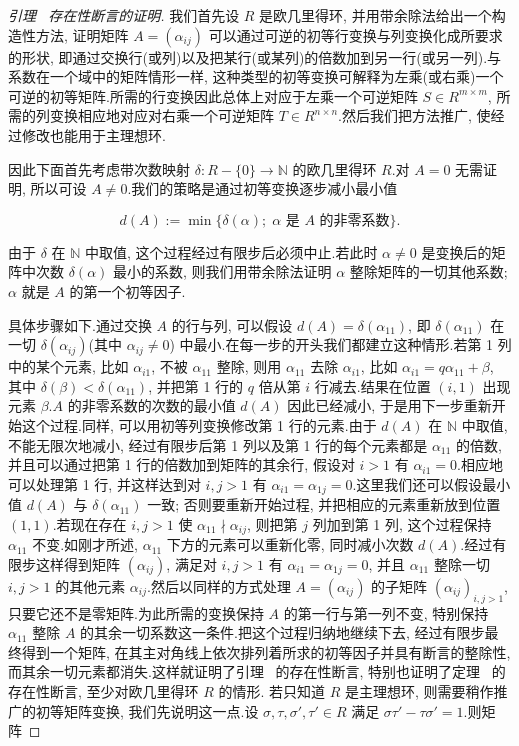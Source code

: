 \begin{proof}[引理~ 存在性断言的证明]
我们首先设 $R$ 是欧几里得环, 并用带余除法给出一个构造性方法, 证明矩阵 $A = (\alpha_{ij})$ 可以通过可逆的初等行变换与列变换化成所要求的形状, 即通过交换行(或列)以及把某行(或某列)的倍数加到另一行(或另一列).与系数在一个域中的矩阵情形一样, 这种类型的初等变换可解释为左乘(或右乘)一个可逆的初等矩阵.所需的行变换因此总体上对应于左乘一个可逆矩阵 $S \in R^{m \times m}$, 所需的列变换相应地对应对右乘一个可逆矩阵 $T \in R^{n \times n}$.然后我们把方法推广, 使经过修改也能用于主理想环.

因此下面首先考虑带次数映射 $\delta \colon R - \{0\} \longrightarrow \mathbb{N}$ 的欧几里得环 $R$.对 $A = 0$ 无需证明, 所以可设 $A \neq 0$.我们的策略是通过初等变换逐步减小最小值

\[
d(A) := \min\{\delta(\alpha);\; \alpha \text{ 是 } A \text{ 的非零系数}\}\text{.}\]

由于 $\delta$ 在 $\mathbb{N}$ 中取值, 这个过程经过有限步后必须中止.若此时 $\alpha \neq 0$ 是变换后的矩阵中次数 $\delta(\alpha)$ 最小的系数, 则我们用带余除法证明 $\alpha$ 整除矩阵的一切其他系数; $\alpha$ 就是 $A$ 的第一个初等因子.

具体步骤如下.通过交换 $A$ 的行与列, 可以假设 $d(A) = \delta(\alpha_{11})$, 即 $\delta(\alpha_{11})$ 在一切 $\delta(\alpha_{ij})$(其中 $\alpha_{ij} \neq 0$) 中最小.在每一步的开头我们都建立这种情形.若第 1 列中的某个元素, 比如 $\alpha_{i1}$, 不被 $\alpha_{11}$ 整除, 则用 $\alpha_{11}$ 去除 $\alpha_{i1}$, 比如 $\alpha_{i1} = q \alpha_{11} + \beta$, 其中 $\delta(\beta) < \delta(\alpha_{11})$, 并把第 1 行的 $q$ 倍从第 $i$ 行减去.结果在位置 $(i, 1)$ 出现元素 $\beta$.$A$ 的非零系数的次数的最小值 $d(A)$ 因此已经减小, 于是用下一步重新开始这个过程.同样, 可以用初等列变换修改第 1 行的元素.由于 $d(A)$ 在 $\mathbb{N}$ 中取值, 不能无限次地减小, 经过有限步后第 1 列以及第 1 行的每个元素都是 $\alpha_{11}$ 的倍数, 并且可以通过把第 1 行的倍数加到矩阵的其余行, 假设对 $i > 1$ 有 $\alpha_{i1} = 0$.相应地可以处理第 1 行, 并这样达到对 $i, j > 1$ 有 $\alpha_{i1} = \alpha_{1j} = 0$.这里我们还可以假设最小值 $d(A)$ 与 $\delta(\alpha_{11})$ 一致; 否则要重新开始过程, 并把相应的元素重新放到位置 $(1, 1)$.若现在存在 $i, j > 1$ 使 $\alpha_{11} \nmid \alpha_{ij}$, 则把第 $j$ 列加到第 1 列, 这个过程保持 $\alpha_{11}$ 不变.如刚才所述, $\alpha_{11}$ 下方的元素可以重新化零, 同时减小次数 $d(A)$.经过有限步这样得到矩阵 $(\alpha_{ij})$, 满足对 $i, j > 1$ 有 $\alpha_{i1} = \alpha_{1j} = 0$, 并且 $\alpha_{11}$ 整除一切 $i, j > 1$ 的其他元素 $\alpha_{ij}$.然后以同样的方式处理 $A = (\alpha_{ij})$ 的子矩阵 $(\alpha_{ij})_{i, j > 1}$, 只要它还不是零矩阵.为此所需的变换保持 $A$ 的第一行与第一列不变, 特别保持 $\alpha_{11}$ 整除 $A$ 的其余一切系数这一条件.把这个过程归纳地继续下去, 经过有限步最终得到一个矩阵, 在其主对角线上依次排列着所求的初等因子并具有断言的整除性, 而其余一切元素都消失.这样就证明了引理~ 的存在性断言, 特别也证明了定理~ 的存在性断言, 至少对欧几里得环 $R$ 的情形.
若只知道 $R$ 是主理想环, 则需要稍作推广的初等矩阵变换, 我们先说明这一点.设 $\sigma, \tau, \sigma', \tau' \in R$ 满足 $\sigma \tau' - \tau \sigma' = 1$.则矩阵


\end{proof}
